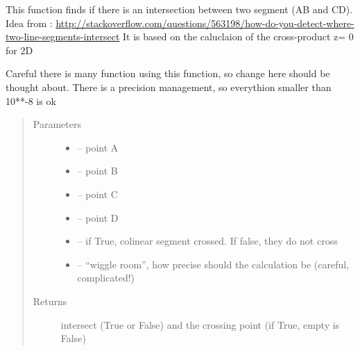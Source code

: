 \documentclass[letterpaper,10pt,english]{sphinxmanual}
\begin{document}
\begin{fulllineitems}
\label{\detokenize{index:src.manage_grid_8.intersection_seg}}
This function finds if there is an intersection between two segment (AB and CD). Idea from :
\url{http://stackoverflow.com/questions/563198/how-do-you-detect-where-two-line-segments-intersect}
It is based on the caluclaion of the cross-product z= 0 for 2D

Careful there is many function using this function, so change here should be thought about. There is a precision
management, so everythion smaller than 10**-8 is ok
\begin{quote}\begin{description}
\item[{Parameters}] \leavevmode\begin{itemize}
\item {} 
 -- point A

\item {} 
 -- point B

\item {} 
 -- point C

\item {} 
 -- point D

\item {} 
 -- if True, colinear segment crossed. If false, they do not cross

\item {} 
 -- ``wiggle room'', how precise should the calculation be (careful, complicated!)

\end{itemize}

\item[{Returns}] \leavevmode
intersect (True or False) and the crossing point (if True, empty is False)

\end{description}\end{quote}

\end{fulllineitems}

\end{document}
